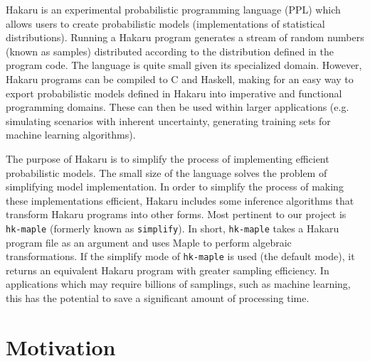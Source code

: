 \documentclass[11pt]{article}
\begin{document}
\begin{justify}
Hakaru \cite{narayanan2016probabilistic} is an experimental probabilistic programming language (PPL) which allows users to create probabilistic models (implementations of statistical distributions). Running a Hakaru program generates a stream of random numbers (known as samples) distributed according to the distribution defined in the program code. The language is quite small given its specialized domain. However, Hakaru programs can be compiled to C and Haskell, making for an easy way to export probabilistic models defined in Hakaru into imperative and functional programming domains. These can then be used within larger applications (e.g. simulating scenarios with inherent uncertainty, generating training sets for machine learning algorithms).

The purpose of Hakaru is to simplify the process of implementing efficient probabilistic models. The small size of the language solves the problem of simplifying model implementation. In order to simplify the process of making these implementations efficient, Hakaru includes some inference algorithms that transform Hakaru programs into other forms. Most pertinent to our project is {\tt hk-maple} (formerly known as {\tt simplify}). In short, {\tt hk-maple} takes a Hakaru program file as an argument and uses Maple to perform algebraic transformations. If the simplify mode of {\tt hk-maple} is used (the default mode), it returns an equivalent Hakaru program with greater sampling efficiency. In applications which may require billions of samplings, such as machine learning, this has the potential to save a significant amount of processing time.


\end{justify}


\section{Motivation}
\end{document}
